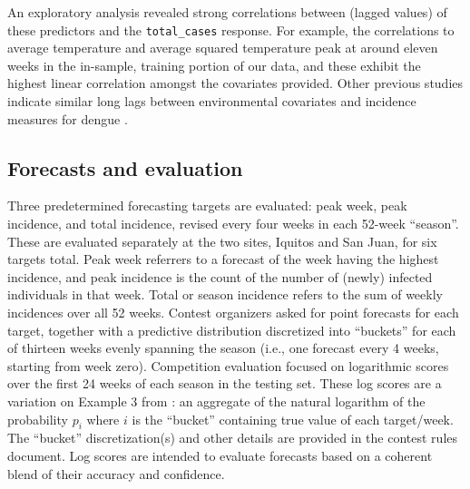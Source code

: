 \documentclass[12pt]{article}
\begin{document}
An exploratory analysis revealed strong correlations between (lagged values)
of these predictors and the \verb|total_cases| response.  For example, the
correlations to average temperature and average squared temperature peak at
around eleven weeks in the in-sample, training portion of our data, and these
exhibit the highest linear correlation amongst the covariates provided. Other
previous studies indicate similar long lags between environmental covariates
and incidence measures for dengue \citep{johansson:etal:2009,
stewart:lowe:2013, stewart:etal:2013,xu:etal:2016}.

\subsection{Forecasts and evaluation}
\label{sec:forecasts}

Three predetermined forecasting targets are evaluated: peak week, peak incidence, and total
incidence, revised every four weeks in each 52-week ``season''.  These are
evaluated separately at the two sites, Iquitos and San Juan, for six targets
total.  Peak week referrers to a forecast of the week having the highest
incidence, and peak incidence is the count of the number of (newly) infected
individuals in that week.  Total or season incidence refers to the sum of
weekly incidences over all 52 weeks.  %
Contest organizers asked for point forecasts for each target, together with a
predictive distribution discretized into ``buckets'' for each of thirteen
weeks evenly spanning the season (i.e., one forecast every 4 weeks, starting
from week zero). Competition evaluation focused on logarithmic scores over the
first 24 weeks of each season in the testing set. These log scores are a variation on Example 3
from \citet[]{gneiting:raftery:2007}: an aggregate of the natural logarithm of
the probability $p_i$  where $i$ is the ``bucket'' containing true value of
each target/week.  The ``bucket'' discretization(s) and other details are
provided in the contest rules document. Log scores are intended to evaluate
forecasts based on a coherent blend of their accuracy and confidence.%
\end{document}
